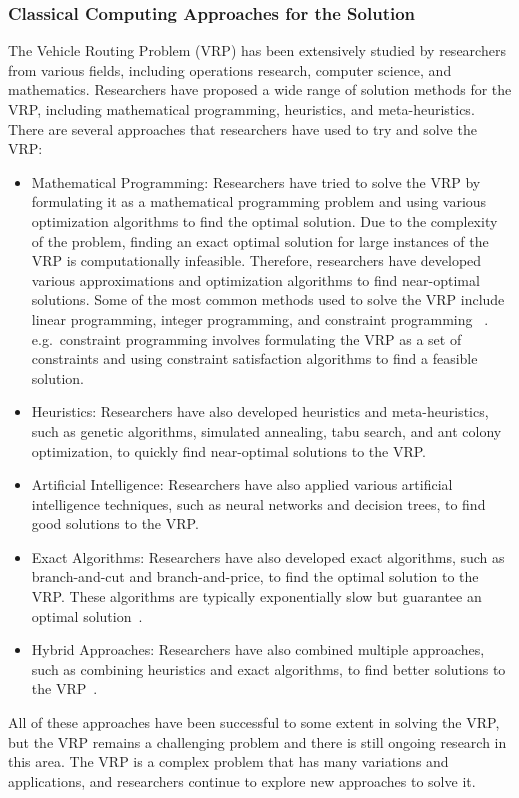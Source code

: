 \subsubsection{Classical Computing Approaches for the Solution}
The Vehicle Routing Problem (VRP) has been extensively studied by researchers from various fields, including operations research,
computer science, and mathematics. Researchers have proposed a wide range of solution methods for the VRP, including mathematical programming, heuristics,
and meta-heuristics.
There are several approaches that researchers have used to try and solve the VRP:
\begin{itemize}
    \item Mathematical Programming: Researchers have tried to solve the VRP by formulating it as a mathematical programming problem and using various optimization algorithms to find the optimal solution.
    Due to the complexity of the problem, finding an exact optimal solution for large instances of the VRP is computationally infeasible.
    Therefore, researchers have developed various approximations and optimization algorithms to find near-optimal solutions.
    Some of the most common methods used to solve the VRP include linear programming, integer programming, and constraint programming ~\cite{toth2002overview}.
    e.g.\ constraint programming involves formulating the VRP as a set of constraints and using constraint satisfaction algorithms to find a feasible solution.
    \item Heuristics: Researchers have also developed heuristics and meta-heuristics, such as genetic algorithms, simulated annealing, tabu search, and ant colony optimization, to quickly find near-optimal solutions to the VRP.
    \item Artificial Intelligence: Researchers have also applied various artificial intelligence techniques, such as neural networks and decision trees, to find good solutions to the VRP.
    \item Exact Algorithms: Researchers have also developed exact algorithms, such as branch-and-cut and branch-and-price, to find the optimal solution to the VRP. These algorithms are typically exponentially slow but guarantee an optimal solution~\cite{laporte1987exact}.
    \item Hybrid Approaches: Researchers have also combined multiple approaches, such as combining heuristics and exact algorithms, to find better solutions to the VRP~\cite{hifi2014hybrid}.
\end{itemize}
All of these approaches have been successful to some extent in solving the VRP, but the VRP remains a challenging problem and there is still ongoing research in this area.
The VRP is a complex problem that has many variations and applications, and researchers continue to explore new approaches to solve it.

